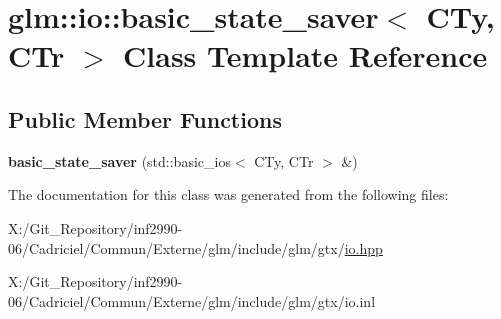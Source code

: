 \hypertarget{classglm_1_1io_1_1basic__state__saver}{\section{glm\-:\-:io\-:\-:basic\-\_\-state\-\_\-saver$<$ C\-Ty, C\-Tr $>$ Class Template Reference}
\label{classglm_1_1io_1_1basic__state__saver}
}
\subsection*{Public Member Functions}
\begin{DoxyCompactItemize}
\item 
\hypertarget{classglm_1_1io_1_1basic__state__saver_ab31652b0b7f2a24fa8f9fda2505de356}{{\bfseries basic\-\_\-state\-\_\-saver} (std\-::basic\-\_\-ios$<$ C\-Ty, C\-Tr $>$ \&)}\label{classglm_1_1io_1_1basic__state__saver_ab31652b0b7f2a24fa8f9fda2505de356}

\end{DoxyCompactItemize}


The documentation for this class was generated from the following files\-:\begin{DoxyCompactItemize}
\item 
X\-:/\-Git\-\_\-\-Repository/inf2990-\/06/\-Cadriciel/\-Commun/\-Externe/glm/include/glm/gtx/\hyperlink{io_8hpp}{io.\-hpp}\item 
X\-:/\-Git\-\_\-\-Repository/inf2990-\/06/\-Cadriciel/\-Commun/\-Externe/glm/include/glm/gtx/io.\-inl\end{DoxyCompactItemize}
